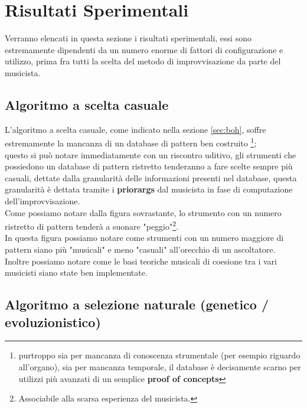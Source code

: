 \section{Risultati Sperimentali}
Verranno elencati in questa sezione i risultati sperimentali, essi
sono estremamente dipendenti da un numero enorme di fattori di configurazione
e utilizzo, prima fra tutti la scelta del metodo di improvvisazione da parte
del musicista.

\subsection{Algoritmo a scelta casuale}
L'algoritmo a scelta casuale, come indicato nella sezione \ref{sec:boh},
soffre estremamente la mancanza di un database di pattern ben costruito
\footnote{purtroppo sia per mancanza di conoscenza strumentale
(per esempio riguardo all'organo), sia per mancanza temporale,
il database è decisamente scarno per utilizzi più avanzati di un semplice
\textbf{proof of concepts}};
\\
questo si può notare immediatamente con un riscontro uditivo,
gli strumenti che possiedono un database di pattern ristretto tenderanno
a fare scelte sempre più casuali, dettate dalla granularità delle informazioni
presenti nel database, questa granularità è dettata tramite i \textbf{priorargs}
dal musicista in fase di computazione dell'improvvisazione.\\
Come possiamo notare dalla figura sovrastante, lo strumento con un numero ristretto
di pattern tenderà a suonare "peggio"\footnote{Associabile alla scarsa esperienza del musicista.}.
\\
In questa figura possiamo notare come strumenti con un numero maggiore di pattern siano
più "musicali" e meno "casuali" all'orecchio di un ascoltatore.\\
Inoltre possiamo notare come le basi teoriche musicali
di coesione tra i vari musicisti siano state ben implementate.

\subsection{Algoritmo a selezione naturale (genetico / evoluzionistico)}

